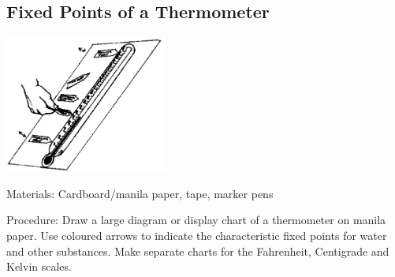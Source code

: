 \begin{multicols}{2}
\subsection{Fixed Points of a Thermometer}

\begin{center}
\includegraphics[width=0.4\textwidth]{./img/source/fixed-points.png}
\end{center}

\begin{description*}
\item[Materials:]{Cardboard/manila paper, tape, marker pens}
\item[Procedure:]{Draw a large diagram or display chart of a thermometer on manila paper. Use coloured arrows to indicate the characteristic fixed points for water and other substances. Make separate charts for the Fahrenheit, Centigrade and Kelvin scales.}
\end{description*}





\end{multicols}

\pagebreak